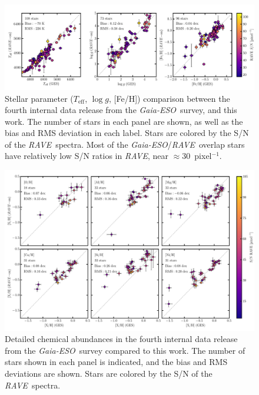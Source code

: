 \documentclass[preprint]{aastex}
\newcommand{\acronym}[1]{{\small{#1}}}
\newcommand{\project}[1]{\textsl{#1}}
\newcommand{\rave}{\project{\acronym{RAVE}}}
\newcommand{\ges}{\project{Gaia-ESO}}
\newcommand{\teff}{T_{\mathrm{eff}}}
\newcommand{\logg}{\log g}
\begin{document}
\begin{figure}[p]
\includegraphics[width=\textwidth]{figures/ges-comparison.pdf}
\caption{Stellar parameter ($\teff$, $\logg$, [Fe/H]) comparison between the fourth internal data release from the \ges\ survey, and this work. The number of stars in each panel are shown, as well as the bias and RMS deviation in each label. Stars are colored by the S/N of the \rave\ spectra.  Most of the \ges/\rave\ overlap stars have relatively low S/N ratios in \rave, near $\approx 30$~pixel$^{-1}$.\label{fig:ges-stellar-parameters}}
\end{figure}


\begin{figure}[p]
\includegraphics[width=\textwidth]{figures/ges-abundances.pdf}
\caption{Detailed chemical abundances in the fourth internal data release from the \ges\ survey compared to this work.  The number of stars shown in each panel is indicated, and the bias and RMS deviations are shown. Stars are colored by the S/N of the \rave\ spectra.\label{fig:ges-abundances}}
\end{figure}
\end{document}
